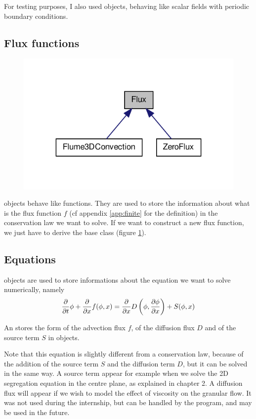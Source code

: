 For testing purposes, I also used  objects, behaving like scalar fields with periodic boundary conditions.

\subsection{Flux functions}

\begin{figure}[htp]
\centering
\includegraphics[scale=1.00]{appendix/class_flux__inherit__graph.pdf}
\caption{}
\label{flux}
\end{figure}

 objects behave like functions. They are used to store the information about what is the flux function $f$ (cf appendix \ref{app:finite} for the definition) in the conservation law we want to solve.
If we want to construct a new flux function, we just have to derive the base class (figure \ref{flux}).

\subsection{Equations}

 objects are used to store informations about the equation we want to solve numerically, namely
\begin{equation}
	\frac{\partial {}}{\partial {t}} \phi + \frac{\partial {}}{\partial {x}} f(\phi, x) = \frac{\partial {}}{\partial {x}} D \left( \phi, \frac{\partial {\phi}}{\partial {x}} \right) + S(\phi, x)
\end{equation}

An  stores the form of the advection flux $f$, of the diffusion flux $D$ and of the source term $S$ in  objects.

Note that this equation is slightly different from a conservation law, because of the addition of the source term $S$ and the diffusion term $D$, but it can be solved in the same way. 
A source term appear for example when we solve the 2D segregation equation in the centre plane, as explained in chapter 2. 
A diffusion flux will appear if we wish to model the effect of viscosity on the granular flow. It was not used during the internship, but can be handled by the program, and may be used in the future.

